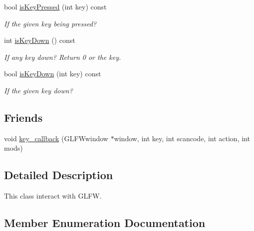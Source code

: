 \begin{DoxyCompactItemize}
bool \hyperlink{classWindow_a70650bc742d83d02d88ea8e4d439c604}{is\+Key\+Pressed} (int key) const 
\begin{DoxyCompactList}\small\item\em If the given key being pressed? \end{DoxyCompactList}\item 
int \hyperlink{classWindow_ad58881f941c43e6dc19761cae3ab8f39}{is\+Key\+Down} () const 
\begin{DoxyCompactList}\small\item\em If any key down? Return 0 or the key. \end{DoxyCompactList}\item 
bool \hyperlink{classWindow_a6a9f53b08efd0a9caae810ea8ae687ac}{is\+Key\+Down} (int key) const 
\begin{DoxyCompactList}\small\item\em If the given key down? \end{DoxyCompactList}\end{DoxyCompactItemize}
\subsection*{Friends}
\begin{DoxyCompactItemize}
\item 
void \hyperlink{classWindow_a286930f4e8ede059b83ff6eafa2ff718}{key\+\_\+callback} (G\+L\+F\+Wwindow $\ast$window, int key, int scancode, int action, int mods)
\end{DoxyCompactItemize}


\subsection{Detailed Description}
This class interact with G\+L\+F\+W. 

\subsection{Member Enumeration Documentation}
\hypertarget{classWindow_a777c693a4c2b74e712839aa15189e07f}{}
